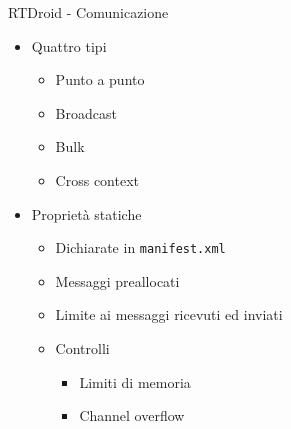 \begin{frame}{RTDroid - Comunicazione}
	\begin{itemize}
		\item Quattro tipi
		\begin{itemize}
			\item Punto a punto
			\item Broadcast
			\item Bulk
			\item Cross context
		\end{itemize}
		\item Proprietà statiche
		\begin{itemize}
			\item Dichiarate in \texttt{manifest.xml}
			\item Messaggi preallocati
			\item Limite ai messaggi ricevuti ed inviati
			\item Controlli
			\begin{itemize}
				\item Limiti di memoria
				\item Channel overflow
			\end{itemize}
		\end{itemize}
	\end{itemize}
\end{frame}